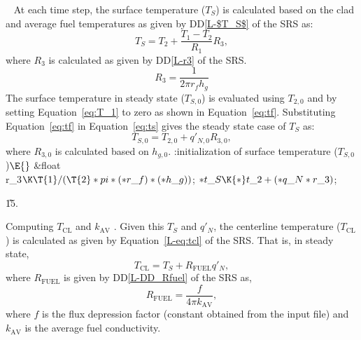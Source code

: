 \documentclass[letterpaper,12pt,baseclass=report]{cweb-hy}
\begin{document}
{
~\newline
At each time step, the surface temperature ($T_{S}$) is calculated based on
the clad and average fuel temperatures as given by DD\ref{L-$T_S$} of the SRS
as:
\begin{equation}
T_S = T_2 + \frac{T_1 - T_2}{R_1}R_3, \label{eq:ts}
\end{equation}
where $R_3$ is calculated as given by DD\ref{L-r3} of the SRS.
\begin{equation}
R_3=\frac{1}{2\pi r_f h_{g}}
\end{equation}
The surface temperature in steady state ($T_{S,0}$) is evaluated using
$T_{2,0}$ and by setting Equation~\ref{eq:T_1} to zero as shown in
Equation~\ref{eq:tf}.
Substituting Equation~\ref{eq:tf} in Equation~\ref{eq:ts} gives the steady
state
case of $T_S$ as:
\begin{equation}
T_{S,0} = T_{2,0}+q'_{N,0}R_{3,0},
\end{equation}
where $R_{3,0}$ is calculated based on  $h_{g,0}$.
\Y\B\4:initialization of surface temperature ($T_{S,0}$)\X${}\E{}$\6
\&{float} \\{r\_3}${}\K\T{1}/(\T{2}*\\{pi}*({*}\\{r\_f})*({*}\\{h\_g})){}$;%
\7
${}{*}\\{t\_S}\K{*}\\{t\_2}+({*}\\{q\_N}*\\{r\_3}){}$;\par
\U15.\fi


\fi

Computing $T_{\text{CL}}$ and  $k_{\text{AV}}$ .\label{tclkav}
Given this $T_S$ and $q'_N$, the centerline temperature
($T_{\mathrm{CL}}$) is calculated as given by Equation~\ref{L-eq:tcl} of the
SRS.
That is, in steady state,
\begin{equation}
T_{\mathrm{CL}}=T_S+R_{\text{FUEL}}q'_N, \label{eq:TCL}
\end{equation}
where $R_{\text{FUEL}}$ is given by DD\ref{L-DD_Rfuel} of the SRS as,
\begin{equation}
R_{\text{FUEL}}=\frac{f}{4\pi k_{\mathrm{AV}}}, \label{eq:rfuel}
\end{equation}
\noindent where $f$ is the flux depression factor (constant obtained from the
input file)
and $k_{\mathrm{AV}}$ is the
average fuel conductivity.

}
\end{document}
